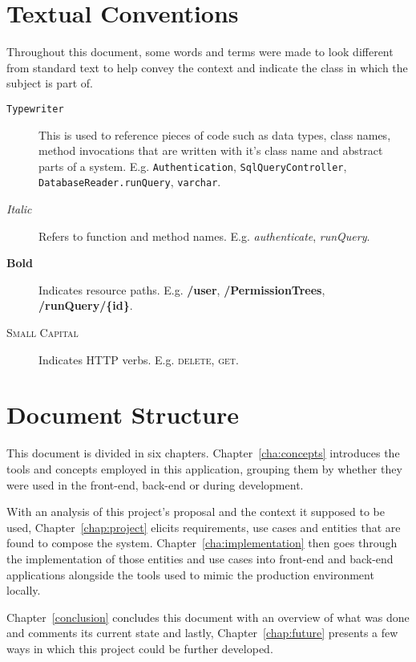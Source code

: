 \section{Textual Conventions}

Throughout this document, some words and terms were made to look different from standard text to help convey the context and indicate the class in which the subject is part of. 

\begin{description}
\item[\texttt{Typewriter}] This is used to reference pieces of code such as data types, class names, method invocations that are written with it's class name and abstract parts of a system. E.g. \texttt{Authentication}, \texttt{SqlQueryController}, \texttt{DatabaseReader.runQuery}, \texttt{varchar}.
\item[\textit{Italic}] Refers to function and method names. E.g. \textit{authenticate}, \textit{runQuery}.
\item[\textbf{Bold}] Indicates resource paths. E.g. \textbf{/user}, \textbf{/PermissionTrees}, \textbf{/runQuery/\{id\}}.
\item[\textsc{Small Capital}] Indicates HTTP verbs. E.g. \textsc{delete}, \textsc{get}.
\end{description}

\section{Document Structure}

This document is divided in six chapters. Chapter~\ref{cha:concepts} introduces the tools and concepts employed in this application, grouping them by whether they were used in the front-end, back-end or during development.

With an analysis of this project's proposal and the context it supposed to be used, Chapter~\ref{chap:project} elicits requirements, use cases and entities that are found to compose the system. Chapter~\ref{cha:implementation} then goes through the implementation of those entities and use cases into front-end and back-end applications alongside the tools used to mimic the production environment locally.

Chapter~\ref{conclusion} concludes this document with an overview of what was done and comments its current state and lastly, Chapter~\ref{chap:future} presents a few ways in which this project could be further developed.